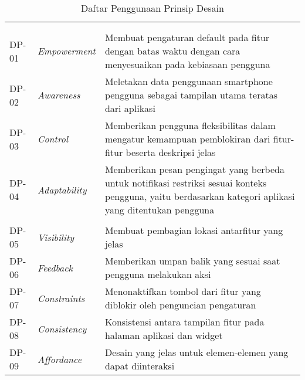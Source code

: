 \RaggedLeft
\begin{small}
\begin{longtable}[c]{|W{c}{0.07\textwidth}|>{\cccnormspacingcenter}m{0.18\textwidth}|>{\cccnormspacing}m{0.65\textwidth}|}
  \caption{Daftar Penggunaan Prinsip Desain}
  \label{tab:prinsip_desain} \\
  \hline {}
   &  &  \\ \hline \endfirsthead
  \hline {}
   &  &  \\ \hline \endhead

  \hline \endfoot
  
    \\ \hline
  DP-01 & \textit{Empowerment} & Membuat pengaturan default pada fitur dengan batas waktu dengan cara menyesuaikan pada kebiasaan pengguna \\ \hline
  DP-02 & \textit{Awareness} & Meletakan data penggunaan smartphone pengguna sebagai tampilan utama teratas dari aplikasi \\ \hline
  DP-03 & \textit{Control} & Memberikan pengguna fleksibilitas dalam mengatur kemampuan pemblokiran dari fitur-fitur beserta deskripsi jelas \\ \hline
  DP-04 & \textit{Adaptability} & Memberikan pesan pengingat yang berbeda untuk notifikasi restriksi sesuai konteks pengguna, yaitu berdasarkan kategori aplikasi yang ditentukan pengguna \\ \hline
    \\ \hline
  DP-05 & \textit{Visibility} & Membuat pembagian lokasi antarfitur yang jelas \\ \hline
  DP-06 & \textit{Feedback} & Memberikan umpan balik yang sesuai saat pengguna melakukan aksi \\ \hline
  DP-07 & \textit{Constraints} & Menonaktifkan tombol dari fitur yang diblokir oleh penguncian pengaturan \\ \hline
  DP-08 & \textit{Consistency} & Konsistensi antara tampilan fitur pada halaman aplikasi dan widget \\ \hline
  DP-09 & \textit{Affordance} & Desain yang jelas untuk elemen-elemen yang dapat diinteraksi \\ \hline

\end{longtable}
\end{small}
\justifying
\FloatBarrier

